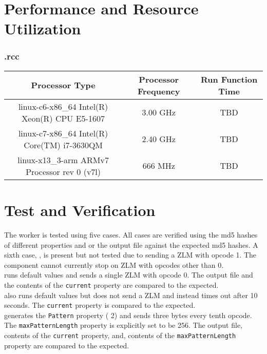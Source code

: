 \section*{Performance and Resource Utilization}
\subsubsection*{\comp.rcc}
\begin{scriptsize}
	\begin{tabular}{|c|c|c|}
		\hline
		\rowcolor{blue}
		Processor Type                                & Processor Frequency & Run Function Time \\
		\hline
		linux-c6-x86\_64 Intel(R) Xeon(R) CPU E5-1607 & 3.00 GHz            & TBD               \\
		\hline
		linux-c7-x86\_64 Intel(R) Core(TM) i7-3630QM  & 2.40 GHz            & TBD               \\
		\hline
		linux-x13\_3-arm ARMv7 Processor rev 0 (v7l)  & 666 MHz             & TBD               \\
		\hline
	\end{tabular}
\end{scriptsize}
\fi
\section*{Test and Verification}
The {\comp} worker is tested using five cases. All cases are verified using the md5 hashes of different        properties and or the output file against the expected md5 hashes. A sixth case, {}, is present but not tested due to sending a ZLM with opcode 1. The {} component cannot currently stop on ZLM with opcodes other than 0.\\

{} runs default values and sends a single ZLM with opcode 0. The output file and the contents of the \verb+current+ property are compared to the expected.\\

{} also runs default values but does not send a ZLM and instead times out after 10 seconds. The \verb+current+ property is compared to the expected.\\

{} generates the \verb+Pattern+ property {( 2)} and sends three bytes every tenth opcode. The \verb+maxPatternLength+ property is explicitly set to be 256. The output file, contents of the \verb+current+ property, and, contents of the \verb+maxPatternLength+ property are compared to the expected.\\

